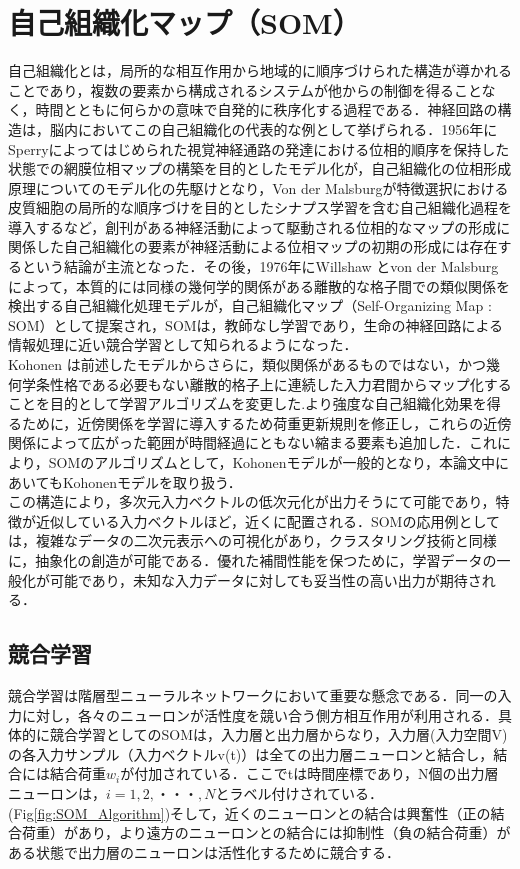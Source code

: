 \section{自己組織化マップ（SOM）}
自己組織化とは，局所的な相互作用から地域的に順序づけられた構造が導かれることであり，複数の要素から構成されるシステムが他からの制御を得ることなく，時間とともに何らかの意味で自発的に秩序化する過程である．神経回路の構造は，脳内においてこの自己組織化の代表的な例として挙げられる．1956年にSperryによってはじめられた視覚神経通路の発達における位相的順序を保持した状態での網膜位相マップの構築を目的としたモデル化が，自己組織化の位相形成原理についてのモデル化の先駆けとなり，Von der Malsburg\cite{von_der_Malsburg}が特徴選択における皮質細胞の局所的な順序づけを目的としたシナプス学習を含む自己組織化過程を導入するなど，創刊がある神経活動によって駆動される位相的なマップの形成に関係した自己組織化の要素が神経活動による位相マップの初期の形成には存在するという結論が主流となった．その後，1976年にWillshaw とvon der Malsburg\cite{WILLSHAW}によって，本質的には同様の幾何学的関係がある離散的な格子間での類似関係を検出する自己組織化処理モデルが，自己組織化マップ（Self-Organizing Map : SOM）として提案され，SOMは，教師なし学習であり，生命の神経回路による情報処理に近い競合学習として知られるようになった．\\
Kohonen は前述したモデルからさらに，類似関係があるものではない，かつ幾何学条性格である必要もない離散的格子上に連続した入力君間からマップ化することを目的として学習アルゴリズムを変更した\cite{The_Eye_and_the_Brain}.より強度な自己組織化効果を得るために，近傍関係を学習に導入するため荷重更新規則を修正し，これらの近傍関係によって広がった範囲が時間経過にともない縮まる要素も追加した．これにより，SOMのアルゴリズムとして，Kohonenモデルが一般的となり，本論文中にあいてもKohonenモデルを取り扱う．\\
この構造により，多次元入力ベクトルの低次元化が出力そうにて可能であり，特徴が近似している入力ベクトルほど，近くに配置される．SOMの応用例としては，複雑なデータの二次元表示への可視化があり，クラスタリング技術と同様に，抽象化の創造が可能である．優れた補間性能を保つために，学習データの一般化が可能であり，未知な入力データに対しても妥当性の高い出力が期待される．
\subsection{競合学習}
競合学習は階層型ニューラルネットワークにおいて重要な懸念である．同一の入力に対し，各々のニューロンが活性度を競い合う側方相互作用が利用される．具体的に競合学習としてのSOMは，入力層と出力層からなり，入力層(入力空間V)の各入力サンプル（入力ベクトルv(t)）は全ての出力層ニューロンと結合し，結合には結合荷重$w_i$が付加されている．ここでtは時間座標であり，N個の出力層ニューロンは，$i=1,2,・・・,N$とラベル付けされている．(Fig\ref{fig:SOM_Algorithm})そして，近くのニューロンとの結合は興奮性（正の結合荷重）があり，より遠方のニューロンとの結合には抑制性（負の結合荷重）がある状態で出力層のニューロンは活性化するために競合する．

